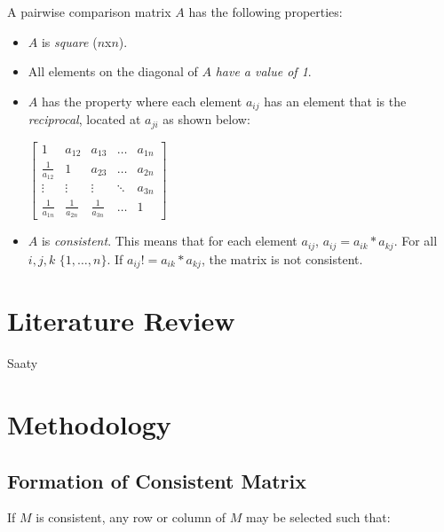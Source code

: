 \documentclass[12pt]{amsart}
\theoremstyle{definition}
\begin{document}
A pairwise comparison matrix $A$ has the following properties:
\begin{itemize}
\item $A$ is \textit{square} ($n$x$n$).
\item All elements on the diagonal of $A$ \textit{have a value of 1}.
\item $A$ has the property where each element $a_{ij}$ has an element that is the \textit{reciprocal}, located at $a_{ji}$ as shown below:

\begin{center}


$
\begin{bmatrix}
    1 & a_{12} & a_{13} & \dots  & a_{1n} \\
    \frac{1}{a_{12}} & 1 & a_{23} & \dots  & a_{2n} \\
    \vdots & \vdots & \vdots & \ddots & a_{3n} \\
    \frac{1}{a_{1n}} & \frac{1}{a_{2n}} & \frac{1}{a_{3n}} & \dots  & 1
\end{bmatrix}
$
\end{center}

\item $A$ is \textit{consistent}.  This means that for each element $a_{ij}$, $a_{ij}=a_{ik}*a_{kj}$.  For all $i,j,k$ $\{1,\dots,n\}$. If $a_{ij}!=a_{ik}*a_{kj}$, the matrix is not consistent.
\end{itemize}

\cite{saaty2000fundamentals}



\section{Literature Review}

%
Saaty

\section{Methodology}

\subsection{Formation of Consistent Matrix}
If $M$ is consistent, any row or column of $M$ may be selected such that:
\end{document}
